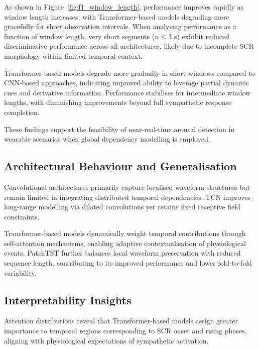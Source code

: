 \documentclass[runningheads]{llncs}
\begin{document}
As shown in Figure~\ref{fig:f1_window_length}, performance improves rapidly as window length increases, with Transformer-based models degrading more gracefully for short observation intervals. When analysing performance as a function of window length, very short segments ($n \leq 3$ s) exhibit reduced discriminative performance across all architectures, likely due to incomplete SCR morphology within limited temporal context.

Transformer-based models degrade more gradually in short windows compared to CNN-based approaches, indicating improved ability to leverage partial dynamic cues and derivative information. Performance stabilises for intermediate window lengths, with diminishing improvements beyond full sympathetic response completion.

These findings support the feasibility of near-real-time arousal detection in wearable scenarios when global dependency modelling is employed.

\subsection{Architectural Behaviour and Generalisation}

Convolutional architectures primarily capture localised waveform structures but remain limited in integrating distributed temporal dependencies. TCN improves long-range modelling via dilated convolutions yet retains fixed receptive field constraints.

Transformer-based models dynamically weight temporal contributions through self-attention mechanisms, enabling adaptive contextualisation of physiological events. PatchTST further balances local waveform preservation with reduced sequence length, contributing to its improved performance and lower fold-to-fold variability.

\subsection{Interpretability Insights}

Attention distributions reveal that Transformer-based models assign greater importance to temporal regions corresponding to SCR onset and rising phases, aligning with physiological expectations of sympathetic activation.
\end{document}
